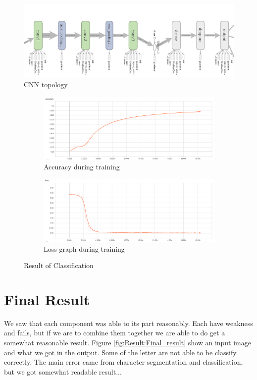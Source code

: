 \documentclass[Report.tex]{subfiles}
\begin{document}
\begin{figure}[!htb]
\includegraphics[width=\textwidth]{res/topology.png}
\caption{CNN topology}
\label{fig_topology}
\end{figure}

\begin{figure}[!htb]
  \begin{subfigure}[t]{\textwidth}
    \centering
    \includegraphics[width=\textwidth]{res/accuracy.png}
    \caption{Accuracy during training}
    \label{fig_accuracy}
  \end{subfigure}
  \begin{subfigure}[t]{\textwidth}
    \centering
    \includegraphics[width=\textwidth]{res/loss.png}
    \caption{Loss graph during training}
    \label{fig_loss}
  \end{subfigure}
  \caption{Result of Classification}
  \label{fig:Character_segmentation}
\end{figure}

\newpage
\section{Final Result}
We saw that each component was able to its part reasonably. Each have weakness and fails, but if we are to combine them together we are able to do get a somewhat reasonable result. Figure \ref{fig:Result:Final_result} show an input image and what we got in the output. Some of the letter are not able to be classify correctly. The main error came from character segmentation and classification, but we got somewhat readable result... 
\end{document}
